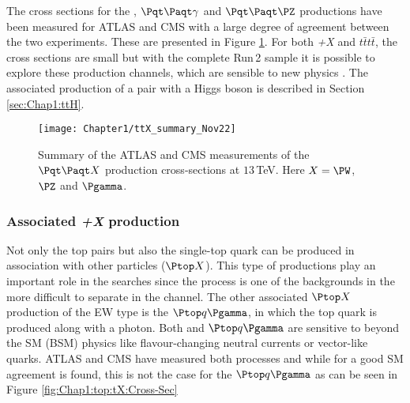 The cross sections for the \ttW, $\ttbar \gamma$ and $\ttbar \PZ$ productions 
have been measured for ATLAS and CMS with a large degree of agreement between the 
two experiments. %
These are presented in 
Figure \ref{fig:Chap1:top:ttX:Cross-Sec}. For both \ttbar\textit{+X} and $t\bar{t}t\bar{t}$, the cross sections
are small but with the complete Run$\,$2 sample it is possible to explore these production channels, which
are sensible to new physics \cite{ATLAS:2020hpj}.  The associated production of a \ttbar pair with a Higgs boson
is described in Section \ref{sec:Chap1:ttH}.

\begin{figure}
    \centering
    \texttt{[image: Chapter1/ttX\_summary\_Nov22]}
    \caption{Summary of the ATLAS and CMS measurements of the $\ttbar X$ production 
    cross-sections at $13\,$TeV. Here $X=\PW$, $\PZ$ and $\Pgamma$.} %
    \label{fig:Chap1:top:ttX:Cross-Sec}
\end{figure}

\subsubsection{Associated \Ptop\textit{+X} production}
\label{sec:Chap1:Top:Production:top_plus_X}
Not only the top pairs but also the single-top quark can be produced
in association with other particles ($\Ptop X$). This type of productions
play an important role in the  \tHq searches since the \tZq process
is one of the backgrounds in the more difficult to separate in the
\dilepOStau channel. 
The other associated $\Ptop X$ production of the EW type is the $\Ptop q \Pgamma$, in which the
top quark is produced along with a photon.  Both \tZq and $\Ptop q \Pgamma$
are sensitive to beyond the SM (BSM) physics like flavour-changing neutral currents  or vector-like quarks.
ATLAS and CMS have measured both processes and while for \tZq a good SM agreement
is found, this is not the case for the $\Ptop q \Pgamma$ as can be seen in 
Figure \ref{fig:Chap1:top:tX:Cross-Sec}


